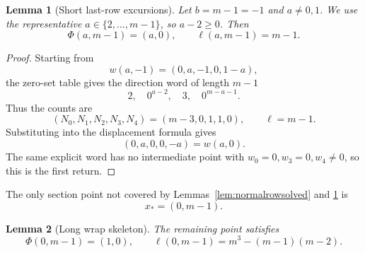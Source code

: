 \documentclass[11pt]{article}
\newtheorem{lemma}{Lemma}
\theoremstyle{definition}
\begin{document}
\begin{lemma}[Short last-row excursions]\label{lem:shortlastrow}
Let \(b=m-1=-1\) and \(a\ne0,1\).  We use the representative \(a\in\{2,\ldots,m-1\}\), so
\(a-2\ge0\).  Then
\[
\Phi(a,m-1)=(a,0),\qquad \ell(a,m-1)=m-1.
\]
\end{lemma}

\begin{proof}
Starting from
\[
w(a,-1)=(0,a,-1,0,1-a),
\]
the zero-set table gives the direction word of length \(m-1\)
\[
2,\quad 0^{a-2},\quad 3,\quad 0^{m-a-1}.
\]
Thus the counts are
\[
(N_0,N_1,N_2,N_3,N_4)=(m-3,0,1,1,0),\qquad \ell=m-1.
\]
Substituting into the displacement formula gives
\[
(0,a,0,0,-a)=w(a,0).
\]
The same explicit word has no intermediate point with \(w_0=0,w_3=0,w_4\ne0\), so this is the first
return.
\end{proof}

The only section point not covered by Lemmas~\ref{lem:normalrowsolved} and \ref{lem:shortlastrow} is
\[
x_*=(0,m-1).
\]

\begin{lemma}[Long wrap skeleton]\label{lem:longwrapclosing}
The remaining point satisfies
\[
\Phi(0,m-1)=(1,0),\qquad
\ell(0,m-1)=m^3-(m-1)(m-2).
\]
\end{lemma}
\end{document}
